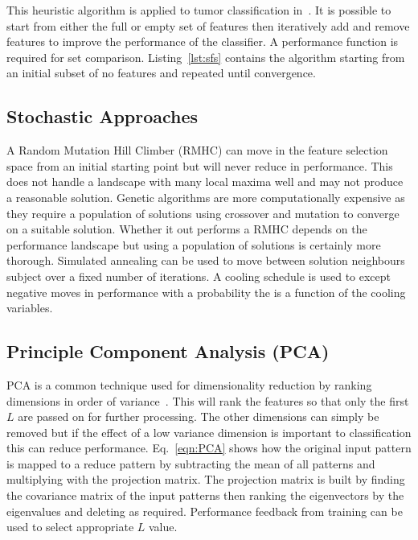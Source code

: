 \documentclass[journal]{IEEEtran}
\begin{document}
This heuristic algorithm is applied to tumor classification in~\cite{hau07feat}.
It is possible to start from either the full or empty set of features then iteratively add and remove features to improve the performance of the classifier. 
A performance function is required for set comparison. 
Listing~\ref{lst:sfs} contains the algorithm starting from an initial subset of no features and repeated until convergence.





\subsection{Stochastic Approaches}
A Random Mutation Hill Climber (RMHC) can move in the feature selection space from an initial starting point but will never reduce in performance.  
This does not handle a landscape with many local maxima well and may not produce a reasonable solution.
Genetic algorithms are more computationally expensive as they require a population of solutions using crossover and mutation to converge on a suitable solution.   
Whether it out performs a RMHC depends on the performance landscape but using a population of solutions is certainly more thorough.    
Simulated annealing can be used to move between solution neighbours subject over a fixed number of iterations.
A cooling schedule is used to except negative moves in performance with a probability the is a function of the cooling variables. 


\subsection{Principle Component Analysis (PCA)}
PCA is a common technique used for dimensionality reduction by ranking dimensions in order of variance~\cite{pearson01pca}.
This will rank the features so that only the first $L$ are passed on for further processing. 
The other dimensions can simply be removed but if the effect of a low variance dimension is important to classification this can reduce performance.
Eq.~\eqref{eqn:PCA} shows how the original input pattern is mapped to a reduce pattern by subtracting the mean of all patterns and multiplying with the projection matrix.
The projection matrix is built by finding the covariance matrix of the input patterns then ranking the eigenvectors by the eigenvalues and deleting as required.
Performance feedback from training can be used to select appropriate $L$ value.
\end{document}
